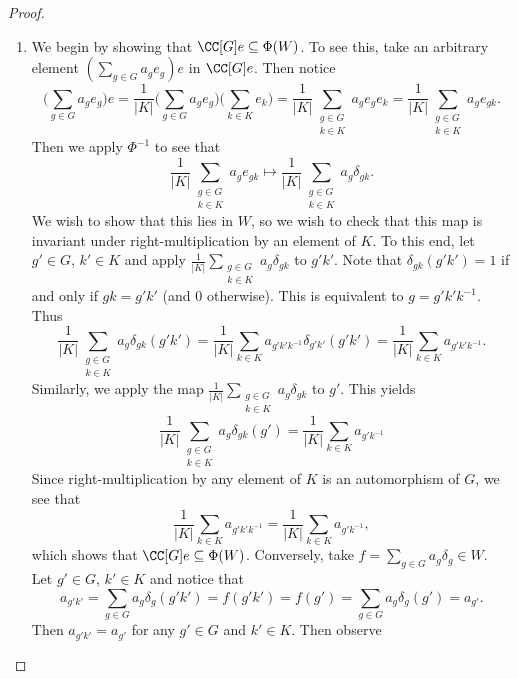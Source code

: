 \documentclass[11pt]{amsart}
\theoremstyle{remark}
\begin{document}
\begin{proof}
	\begin{enumerate}[\itshape(i)]
		\item We begin by showing that $\CC[G]e\subseteq \Phi(W)$.
		      To see this, take an arbitrary element $(\sum_{g\in G} a_ge_g)e$ in $\CC[G]e$.
		      Then notice
		      \[
			      \bigg(\sum_{g\in G} a_ge_g\bigg)e = \frac{1}{|K|}\bigg(\sum_{g\in G} a_ge_g\bigg)\bigg(\sum_{k\in K}e_k\bigg) = \frac{1}{|K|}\sum_{\substack{g\in G \\ k\in K}} a_ge_ge_k = \frac{1}{|K|}\sum_{\substack{g\in G \\ k\in K}} a_ge_{gk}.
		      \]
		      Then we apply $\Phi^{-1}$ to see that
		      \[
			      \frac{1}{|K|}\sum_{\substack{g\in G \\ k\in K}} a_ge_{gk} \mapsto \frac{1}{|K|}\sum_{\substack{g\in G \\ k\in K}} a_g\delta_{gk}.
		      \]
		      We wish to show that this lies in $W$, so we wish to check that this map is invariant under right-multiplication by an element of $K$.
		      To this end, let $g'\in G$, $k'\in K$ and apply $\frac{1}{|K|}\sum_{\substack{g\in G \\ k\in K}} a_g\delta_{gk}$ to $g'k'$.
		      Note that $\delta_{gk}(g'k')=1$ if and only if $gk=g'k'$ (and $0$ otherwise).
		      This is equivalent to $g=g'k'k^{-1}$.
		      Thus
		      \[
			      \frac{1}{|K|}\sum_{\substack{g\in G \\ k\in K}} a_g\delta_{gk}(g'k') = \frac{1}{|K|}\sum_{k\in K} a_{g'k'k^{-1}}\delta_{g'k'}(g'k') = \frac{1}{|K|}\sum_{k\in K} a_{g'k'k^{-1}}.
		      \]
		      Similarly, we apply the map $\frac{1}{|K|}\sum_{\substack{g\in G \\ k\in K}} a_g\delta_{gk}$ to $g'$.
		      This yields
		      \[
			      \frac{1}{|K|}\sum_{\substack{g\in G \\ k\in K}} a_g\delta_{gk}(g') = \frac{1}{|K|}\sum_{k\in K} a_{g'k^{-1}}
		      \]
		      Since right-multiplication by any element of $K$ is an automorphism of $G$, we see that
		      \[
			      \frac{1}{|K|}\sum_{k\in K} a_{g'k'k^{-1}}=\frac{1}{|K|}\sum_{k\in K} a_{g'k^{-1}},
		      \]
		      which shows that $\CC[G]e\subseteq \Phi(W)$.
		      Conversely, take $f=\sum_{g\in G} a_g\delta_g\in W$.
		      Let $g'\in G$, $k'\in K$ and notice that
		      \[
			      a_{g'k'} = \sum_{g\in G} a_g\delta_g(g'k') = f(g'k') = f(g') = \sum_{g\in G} a_g \delta_g(g') = a_{g'}.
		      \]
		      Then $a_{g'k'}=a_{g'}$ for any $g'\in G$ and $k'\in K$.
		      Then observe

\end{enumerate}
\end{proof}
\end{document}
